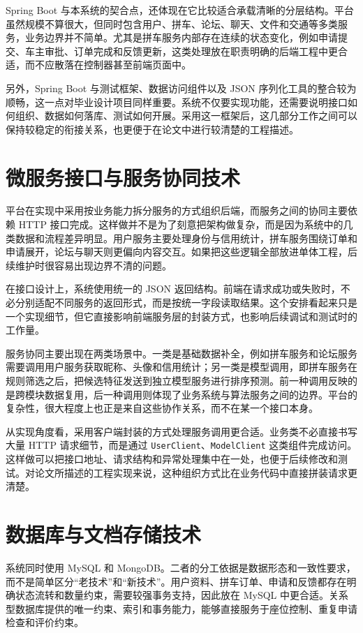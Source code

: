 Spring Boot 与本系统的契合点，还体现在它比较适合承载清晰的分层结构。平台虽然规模不算很大，但同时包含用户、拼车、论坛、聊天、文件和交通等多类服务，业务边界并不简单。尤其是拼车服务内部存在连续的状态变化，例如申请提交、车主审批、订单完成和反馈更新，这类处理放在职责明确的后端工程中更合适，而不应散落在控制器甚至前端页面中。

另外，Spring Boot 与测试框架、数据访问组件以及 JSON 序列化工具的整合较为顺畅，这一点对毕业设计项目同样重要。系统不仅要实现功能，还需要说明接口如何组织、数据如何落库、测试如何开展。采用这一框架后，这几部分工作之间可以保持较稳定的衔接关系，也更便于在论文中进行较清楚的工程描述。


\section{微服务接口与服务协同技术}

平台在实现中采用按业务能力拆分服务的方式组织后端，而服务之间的协同主要依赖 HTTP 接口完成。这样做并不是为了刻意把架构做复杂，而是因为系统中的几类数据和流程差异明显。用户服务主要处理身份与信用统计，拼车服务围绕订单和申请展开，论坛与聊天则更偏向内容交互。如果把这些逻辑全部放进单体工程，后续维护时很容易出现边界不清的问题。

在接口设计上，系统使用统一的 JSON 返回结构\cite{fielding2000}。前端在请求成功或失败时，不必分别适配不同服务的返回形式，而是按统一字段读取结果。这个安排看起来只是一个实现细节，但它直接影响前端服务层的封装方式，也影响后续调试和测试时的工作量。

服务协同主要出现在两类场景中。一类是基础数据补全，例如拼车服务和论坛服务需要调用用户服务获取昵称、头像和信用统计；另一类是模型调用，即拼车服务在规则筛选之后，把候选特征发送到独立模型服务进行排序预测。前一种调用反映的是跨模块数据复用，后一种调用则体现了业务系统与算法服务之间的边界。平台的复杂性，很大程度上也正是来自这些协作关系，而不在某一个接口本身。

从实现角度看，采用客户端封装的方式处理服务调用更合适。业务类不必直接书写大量 HTTP 请求细节，而是通过 \texttt{UserClient}、\texttt{ModelClient} 这类组件完成访问。这样做可以把接口地址、请求结构和异常处理集中在一处，也便于后续修改和测试。对论文所描述的工程实现来说，这种组织方式比在业务代码中直接拼装请求更清楚。

\section{数据库与文档存储技术}

系统同时使用 MySQL 和 MongoDB。二者的分工依据是数据形态和一致性要求，而不是简单区分“老技术”和“新技术”。用户资料、拼车订单、申请和反馈都存在明确状态流转和数量约束，需要较强事务支持，因此放在 MySQL 中更合适\cite{gyorodi2015}。关系型数据库提供的唯一约束、索引和事务能力，能够直接服务于座位控制、重复申请检查和评价约束。


